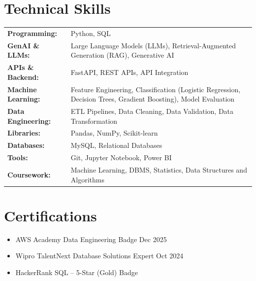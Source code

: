 \documentclass[a4paper,10pt]{article}
\begin{document}
\section{Technical Skills}
\begin{tabularx}{\linewidth}{@{}l X@{}}
\textbf{Programming:} & Python, SQL \\
\textbf{GenAI \& LLMs:} & Large Language Models (LLMs), Retrieval-Augmented Generation (RAG), Generative AI \\
\textbf{APIs \& Backend:} & FastAPI, REST APIs, API Integration \\
\textbf{Machine Learning:} & Feature Engineering, Classification (Logistic Regression, Decision Trees, Gradient Boosting), Model Evaluation \\
\textbf{Data Engineering:} & ETL Pipelines, Data Cleaning, Data Validation, Data Transformation \\
\textbf{Libraries:} & Pandas, NumPy, Scikit-learn \\
\textbf{Databases:} & MySQL, Relational Databases \\
\textbf{Tools:} & Git, Jupyter Notebook, Power BI \\
\textbf{Coursework:} & Machine Learning, DBMS, Statistics, Data Structures and Algorithms \\
\end{tabularx}

\section{Certifications}
\begin{itemize}[leftmargin=1em, itemsep=1pt, label=--, nosep]
    \item AWS Academy Data Engineering Badge \hfill Dec 2025
    \item Wipro TalentNext Database Solutions Expert \hfill Oct 2024
    \item HackerRank SQL -- 5-Star (Gold) Badge
\end{itemize}
\end{document}
